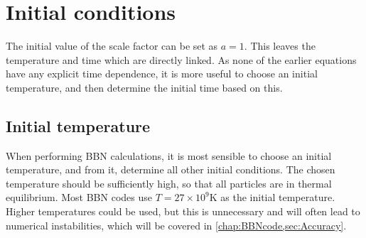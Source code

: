 
\section{Initial conditions}
The initial value of the scale factor can be set as $a=1$. This leaves the temperature and time which are directly linked. As none of the earlier equations have any explicit time dependence, it is more useful to choose an initial temperature, and then determine the initial time based on this.

\subsection{Initial temperature}
When performing BBN calculations, it is most sensible to choose an initial temperature, and from it, determine all other initial conditions. The chosen temperature should be sufficiently high, so that all particles are in thermal equilibrium. Most BBN codes use $T=27\times10^9$K as the initial temperature. Higher temperatures could be used, but this is unnecessary and will often lead to numerical instabilities, which will be covered in \cref{chap:BBNcode,sec:Accuracy}.

